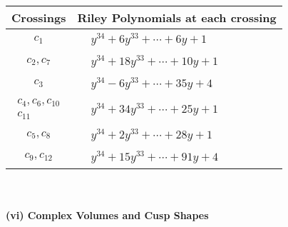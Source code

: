 \documentclass[1p]{elsarticle_modified}
\theoremstyle{definition}
\begin{document}
\begin{tabular}{m{50pt}|m{274pt}}
Crossings & \hspace{64pt}Riley Polynomials at each crossing \\
\hline $$\begin{aligned}c_{1}\end{aligned}$$&$\begin{aligned}
&y^{34}+6 y^{33}+\cdots+6 y+1
\end{aligned}$\\
\hline $$\begin{aligned}c_{2},c_{7}\end{aligned}$$&$\begin{aligned}
&y^{34}+18 y^{33}+\cdots+10 y+1
\end{aligned}$\\
\hline $$\begin{aligned}c_{3}\end{aligned}$$&$\begin{aligned}
&y^{34}-6 y^{33}+\cdots+35 y+4
\end{aligned}$\\
\hline $$\begin{aligned}c_{4},c_{6},c_{10}\\c_{11}\end{aligned}$$&$\begin{aligned}
&y^{34}+34 y^{33}+\cdots+25 y+1
\end{aligned}$\\
\hline $$\begin{aligned}c_{5},c_{8}\end{aligned}$$&$\begin{aligned}
&y^{34}+2 y^{33}+\cdots+28 y+1
\end{aligned}$\\
\hline $$\begin{aligned}c_{9},c_{12}\end{aligned}$$&$\begin{aligned}
&y^{34}+15 y^{33}+\cdots+91 y+4
\end{aligned}$\\
\hline
\end{tabular}\\~\\
\newpage\flushleft \textbf{(vi) Complex Volumes and Cusp Shapes}
\end{document}
